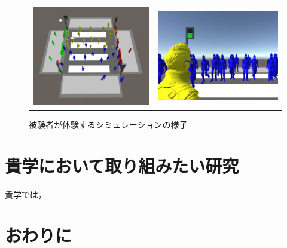 \documentclass[twocolumn]{jarticle}%
\begin{document}
\begin{figure}[H]
    \begin{tabular}{cc}
      \begin{minipage}[t]{0.45\hsize}
        \centering
        \includegraphics[keepaspectratio, scale=0.11]{images/environment.JPG}
        \caption{シミュレーション環境}
        \label{fig:environment}
      \end{minipage} &
      \begin{minipage}[t]{0.45\hsize}
        \centering
        \includegraphics[keepaspectratio, scale=0.1]{images/user_view_mini.JPG}
        \caption{被験者が体験するシミュレーションの様子}
        \label{fig:user_view}
      \end{minipage}
    \end{tabular}
  \end{figure}

\section{貴学において取り組みたい研究}\label{want}
貴学では，

\section{おわりに}





\end{document}
